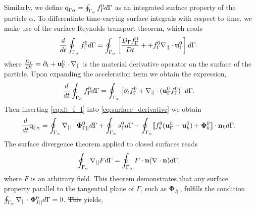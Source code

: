 \documentclass[11pt]{My_preprint}
\providecommand{\DIFadd}[1]{{\protect\color{blue}\uwave{#1}}} %
\providecommand{\DIFdel}[1]{{\protect\color{red}\sout{#1}}}                      %
\providecommand{\DIFaddbegin}{} %
\providecommand{\DIFaddend}{} %
\providecommand{\DIFdelbegin}{} %
\providecommand{\DIFdelend}{} %
\begin{document}
Similarly, we define $\text q_{\Gamma\alpha} = \oint_{\Gamma_{\alpha}}  f_\Gamma^0 d\Gamma$ as an integrated surface property of the particle $\alpha$.
To differentiate time-varying surface integrals with respect to time, we make use of the surface Reynolds transport theorem, which reads \citep[Appendix B]{morel2015mathematical} \begin{equation}
    \ddt  \intS{f_\Gamma^0 }
    = \intS{ \left[
        \frac{D_\Gamma f_\Gamma^0}{Dt}+
        +   f_\Gamma^0\gradI \cdot \textbf{u}_\Gamma^0
    \right]}.
    \label{eq:surface_derivative}
\end{equation}
where $\frac{D_\Gamma}{Dt}  = \partial_t + \textbf{u}_\Gamma^0\cdot \mathbf{\nabla}_{||} $ is the material derivative operator on the surface of the particle. 
Upon expanding the acceleration term we obtain the expression,
\begin{equation}
    \ddt  \intS{f_\Gamma^0 }
    = \intS{ \left[
        \pddt f_\Gamma^0
        +   \gradI \cdot (\textbf{u}_\Gamma^0f_\Gamma^0)
    \right]}.
    \label{eq:surface_derivative}
\end{equation}
Then inserting \ref{eq:dt_f_I} into \ref{eq:surface_derivative} we obtain
\begin{equation}
    \ddt  \text q_{\Gamma\alpha}
    = \intS{ 
        \gradI \cdot \boldsymbol{\Phi}_{\Gamma||}^0
    }
    +\intS{ 
        s_\Gamma^0
    }
    - \intS{
 \Jump{
        f_k^0 (\textbf{u}_\Gamma^0 - \textbf{u}_k^0)
        + \mathbf{\Phi}_k^0
    }
    }.
    \label{eq:dt_q_I_alpha}
\end{equation}
The surface divergence theorem applied to closed surfaces  reads \citep{nadim1996concise}
\begin{equation}
    \intS{\gradI F}
    = 
    \intS{ F \cdot\textbf{n} (\div \textbf{n})},
    \label{eq:gauss_surface}
\end{equation} 
where $F$ is an arbitrary field.
This theorem demonstrates that any surface property parallel to the tangential plane of $\Gamma$, such as $\bm\Phi_{I||}$, fulfills the condition $\oint_{\Gamma_{\alpha}} \mathbf{\nabla}_{||}\cdot \bm\Phi_{I||}^0 d\Gamma
= 0$.
\DIFdelbegin \DIFdel{This }\DIFdelend \DIFaddbegin \DIFadd{Therefore \ref{eq:dt_q_I_alpha} }\DIFaddend yields,
\end{document}
